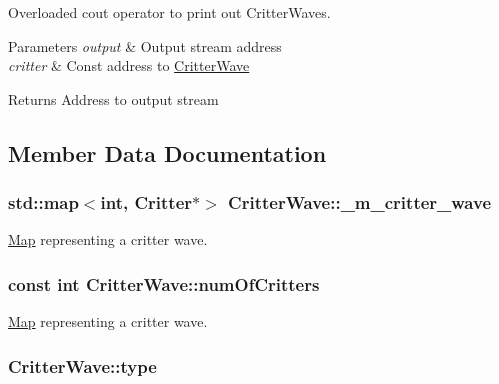 Overloaded cout operator to print out Critter\+Waves. 


\begin{DoxyParams}{Parameters}
{\em output} & Output stream address \\
\hline
{\em critter} & Const address to \hyperlink{class_critter_wave}{Critter\+Wave} \\
\hline
\end{DoxyParams}
\begin{DoxyReturn}{Returns}
Address to output stream 
\end{DoxyReturn}


\subsection{Member Data Documentation}
\hypertarget{class_critter_wave_a82475869f718062181e545afb8277217}{
\subsubsection[{\+\_\+m\+\_\+critter\+\_\+wave}]{\setlength{\rightskip}{0pt plus 5cm}std\+::map$<$int, {\bf Critter}$\ast$$>$ Critter\+Wave\+::\+\_\+m\+\_\+critter\+\_\+wave\hspace{0.3cm}{\ttfamily [private]}}}\label{class_critter_wave_a82475869f718062181e545afb8277217}


\hyperlink{class_map}{Map} representing a critter wave. 

\hypertarget{class_critter_wave_a6c8edb08492ed068c5e4c5323695c29d}{
\subsubsection[{num\+Of\+Critters}]{\setlength{\rightskip}{0pt plus 5cm}const int Critter\+Wave\+::num\+Of\+Critters}}\label{class_critter_wave_a6c8edb08492ed068c5e4c5323695c29d}


\hyperlink{class_map}{Map} representing a critter wave. 

\hypertarget{class_critter_wave_a15d8e4b3eb954f0dfa4f6224d90e0ae0}{
\subsubsection[{type}]{ Critter\+Wave\+::type}}\label{class_critter_wave_a15d8e4b3eb954f0dfa4f6224d90e0ae0}


